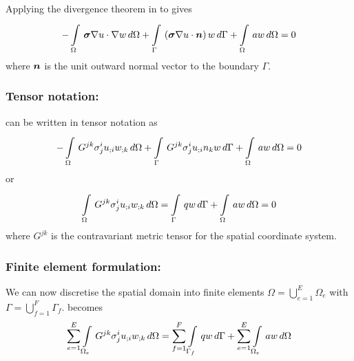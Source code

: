 Applying the divergence theorem in 
to  gives
\begin{equation}
  -\gint{\Omega}{}{\dotprod{\tensor{\sigma}
      \gradient{}{u}}{\gradient{}{w}}}{\Omega}
  +\gint{\Gamma}{}{\pbrac{\dotprod{\tensor{\sigma}\gradient{}{u}}{\normal}}w}{\Gamma}+
  \gint{\Omega}{}{aw}{\Omega}=0
  \label{eqn:Poissonweakform2}
\end{equation}
where $\boldsymbol{n}$ is the unit outward normal vector to the boundary $\Gamma$.

\subsubsection{Tensor notation:}

 can be written in tensor notation as
\begin{equation}
  -\gint{\Omega}{}{G^{jk}\sigma^{i}_{j}\covarderiv{u}{i}\covarderiv{w}{k}}{\Omega}+
  \gint{\Gamma}{}{G^{jk}\sigma^{i}_{j}\covarderiv{u}{i}n_{k}w}{\Gamma} +
  \gint{\Omega}{}{aw}{\Omega}=0
  \label{eqn:Poissontensorform1}
\end{equation}
or
\begin{equation}
  \gint{\Omega}{}{G^{jk}\sigma^{i}_{j}\covarderiv{u}{i}\covarderiv{w}{k}}{\Omega}
  =\gint{\Gamma}{}{qw}{\Gamma} +
  \gint{\Omega}{}{aw}{\Omega}=0
  \label{eqn:Poissontensorform2}
\end{equation}
where $G^{jk}$ is the contravariant metric tensor for the spatial coordinate system.

\subsubsection{Finite element formulation:}


We can now discretise the spatial domain into finite elements \ie $\Omega=
\displaystyle{\bigcup_{e=1}^{E}}\Omega_{e}$ with
$\Gamma=\displaystyle{\bigcup_{f=1}^{F}}\Gamma_{f}$. 
 becomes
\begin{equation}
  \dsum_{e=1}^{E}\gint{\Omega_{e}}{}{G^{jk}\sigma^{i}_{j}
    \covarderiv{u}{i}\covarderiv{w}{k}}{\Omega}=
  \dsum_{f=1}^{F}\gint{\Gamma_{f}}{}{qw}{\Gamma} +
  \dsum_{e=1}^{E}\gint{\Omega_{e}}{}{aw}{\Omega}
  \label{eqn:Poissonfemform}
\end{equation}

